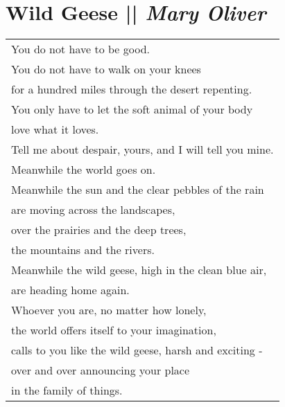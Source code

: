 
\section[Wild Geese]{Wild Geese || \emph{Mary Oliver} \hspace*{\fill}  \thepage}
\label{sec:Wild_Geese.tex}
\vspace*{1.5cm}
\begin{center}
\begin{tabular}{l}
You do not have to be good.\\
You do not have to walk on your knees\\
for a hundred miles through the desert repenting.\\
You only have to let the soft animal of your body\\
love what it loves.\\
Tell me about despair, yours, and I will tell you mine.\\
Meanwhile the world goes on.\\
Meanwhile the sun and the clear pebbles of the rain\\
are moving across the landscapes,\\
over the prairies and the deep trees,\\
the mountains and the rivers.\\
Meanwhile the wild geese, high in the clean blue air,\\
are heading home again.\\
Whoever you are, no matter how lonely,\\
the world offers itself to your imagination,\\
calls to you like the wild geese, harsh and exciting -\\
over and over announcing your place\\
in the family of things.\\
\end{tabular}
\end{center}